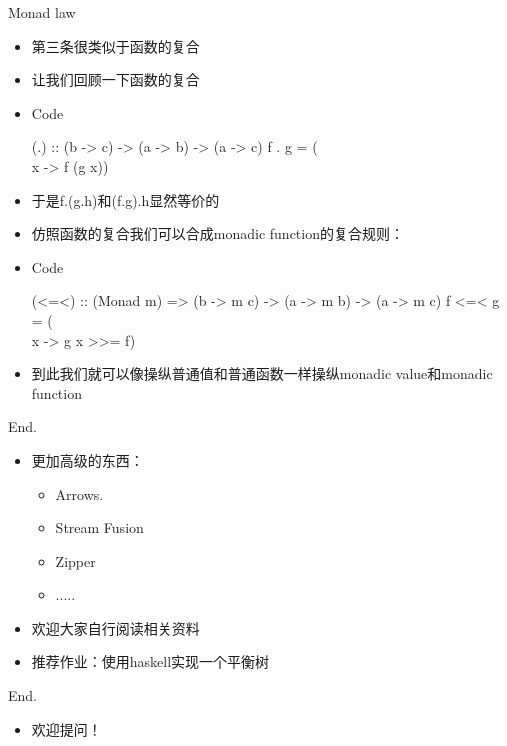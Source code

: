 \documentclass[xcolor=dvipsnames, 11pt]{beamer}
\newenvironment{code}{\begin{block}{Code}\begin{semiverbatim} \begin{footnotesize}}{\end{footnotesize}\end{semiverbatim}\end{block}}
\newenvironment{iit}{\begin{itemize}\setlength{\itemsep}{0.2cm}}{\end{itemize}}
\begin{document}
\begin{frame}[fragile]{Monad law}
\begin{iit}
\item<2->第三条很类似于函数的复合
\item<3->让我们回顾一下函数的复合
\item<4->[]\begin{code}
(.) :: (b -> c) -> (a -> b) -> (a -> c)   
f . g = (\\x -> f (g x))
\end{code}
\item<5->于是f.(g.h)和(f.g).h显然等价的
\item<6->仿照函数的复合我们可以合成monadic function的复合规则：
\item<7->[]\begin{code}
(<=<) :: (Monad m) => (b -> m c) -> (a -> m b) -> (a -> m c)   
f <=< g = (\\x -> g x >>= f)
\end{code}
\item<8->到此我们就可以像操纵普通值和普通函数一样操纵monadic value和monadic function
\end{iit}
\end{frame}

\begin{frame}[fragile]{End.}
\begin{iit}
\item<2->更加高级的东西：
\begin{iit}
\item<3->Arrows. 
\item<4->Stream Fusion
\item<5->Zipper
\item<6->.....
\end{iit}
\item<7->欢迎大家自行阅读相关资料
\item<8->推荐作业：使用haskell实现一个平衡树
\end{iit}
\end{frame}

\begin{frame}[fragile]{End.}
\begin{iit}
\item<2-> 欢迎提问！
\end{iit}
\end{frame}
\end{document}
